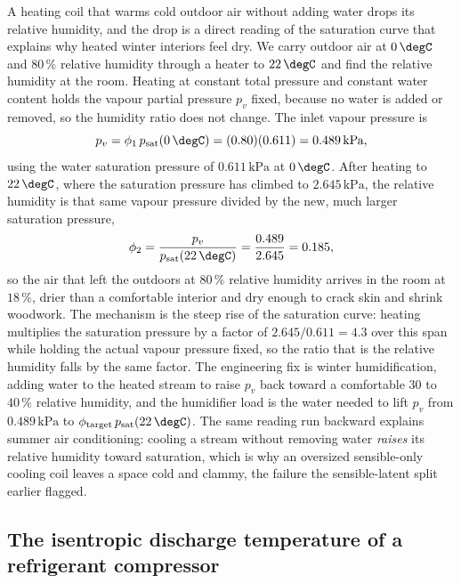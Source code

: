 A heating coil that warms cold outdoor air without adding water drops its
relative humidity, and the drop is a direct reading of the saturation curve
that explains why heated winter interiors feel dry. We carry outdoor air at
$0\,\degC$ and $80\,\%$ relative humidity through a heater to $22\,\degC$ and
find the relative humidity at the room. Heating at constant total pressure
and constant water content holds the vapour partial pressure $p_v$ fixed,
because no water is added or removed, so the humidity ratio does not change.
The inlet vapour pressure is
\[
p_v = \phi_1\,p_{\text{sat}}(0\,\degC) = (0.80)(0.611) = 0.489\,\text{kPa},
\]
using the water saturation pressure of $0.611\,\text{kPa}$ at $0\,\degC$.
After heating to $22\,\degC$, where the saturation pressure has climbed to
$2.645\,\text{kPa}$, the relative humidity is that same vapour pressure
divided by the new, much larger saturation pressure,
\[
\phi_2 = \frac{p_v}{p_{\text{sat}}(22\,\degC)} = \frac{0.489}{2.645} = 0.185,
\]
so the air that left the outdoors at $80\,\%$ relative humidity arrives in
the room at $18\,\%$, drier than a comfortable interior and dry enough to
crack skin and shrink woodwork. The mechanism is the steep rise of the
saturation curve: heating multiplies the saturation pressure by a factor of
$2.645/0.611 = 4.3$ over this span while holding the actual vapour pressure
fixed, so the ratio that is the relative humidity falls by the same factor.
The engineering fix is winter humidification, adding water to the heated
stream to raise $p_v$ back toward a comfortable $30$ to $40\,\%$ relative
humidity, and the humidifier load is the water needed to lift $p_v$ from
$0.489\,\text{kPa}$ to $\phi_{\text{target}}\,p_{\text{sat}}(22\,\degC)$. The
same reading run backward explains summer air conditioning: cooling a stream
without removing water \emph{raises} its relative humidity toward saturation,
which is why an oversized sensible-only cooling coil leaves a space cold and
clammy, the failure the sensible-latent split earlier flagged.

\subsection{The isentropic discharge temperature of a refrigerant compressor}

